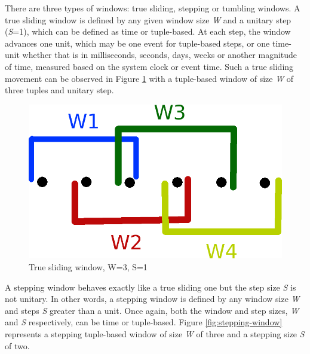 There are three types of windows: true sliding, stepping or tumbling windows.
A true sliding window is defined by any given window size \textit{W} and a unitary step (\textit{S}=1), which can be defined as time or tuple-based. At each step, the window advances one unit, which may be one event for tuple-based steps, or one time-unit whether that is in milliseconds, seconds, days, weeks or another magnitude of time, measured based on the system clock or event time. Such a true sliding movement can be observed in Figure \ref{fig:sliding-window} with a tuple-based window of size \textit{W} of three tuples and unitary step. 

\begin{figure}[!htb]
    \begin{center}
      \includegraphics[scale=0.3]{figures/sliding.png}
      \caption[True sliding window]{True sliding window, W=3, S=1}
      \label{fig:sliding-window}
    \end{center}
\end{figure}

A stepping window behaves exactly like a true sliding one but the step size \textit{S} is not unitary. In other words, a stepping window is defined by any window size \textit{W} and steps \textit{S} greater than a unit. Once again, both the window and step sizes, \textit{W} and \textit{S} respectively, can be time or tuple-based. Figure \ref{fig:stepping-window} represents a stepping tuple-based window of size \textit{W} of three and a stepping size \textit{S} of two.

